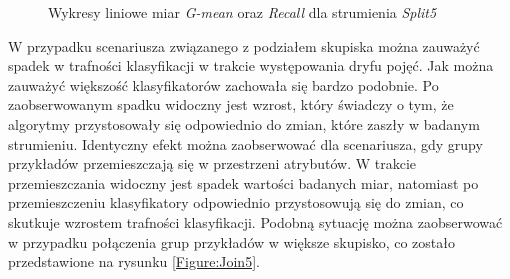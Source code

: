 \begin{figure}[h]
    \centering
    \qquad
    \caption{Wykresy liniowe miar \textit{G-mean} oraz \textit{Recall} dla strumienia \textit{Split5}}\label{Figure:Split5}
\end{figure}

\noindent W przypadku scenariusza związanego z podziałem skupiska można zauważyć spadek w trafności klasyfikacji w trakcie występowania dryfu pojęć. Jak można zauważyć większość klasyfikatorów zachowała się bardzo podobnie. Po zaobserwowanym spadku widoczny jest wzrost, który świadczy o tym, że algorytmy przystosowały się odpowiednio do zmian, które zaszły w badanym strumieniu. Identyczny efekt można zaobserwować dla scenariusza, gdy grupy przykładów przemieszczają się w przestrzeni atrybutów. W trakcie przemieszczania widoczny jest spadek wartości badanych miar, natomiast po przemieszczeniu klasyfikatory odpowiednio przystosowują się do zmian, co skutkuje wzrostem trafności klasyfikacji. Podobną sytuację można zaobserwować w przypadku połączenia grup przykładów w większe skupisko, co zostało przedstawione na rysunku \ref{Figure:Join5}.

